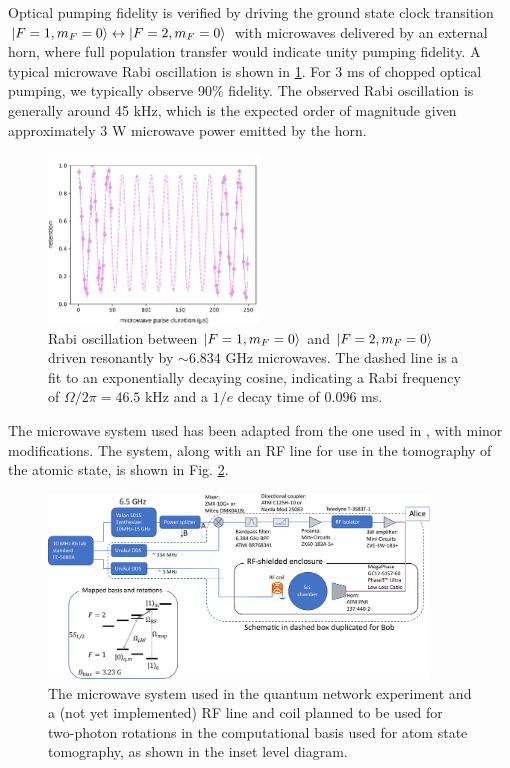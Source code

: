 Optical pumping fidelity is verified by driving the ground state clock transition $\ket{F=1,m_F=0} \leftrightarrow \ket{F=2,m_F=0}$ with microwaves delivered by an external horn, where full population transfer would indicate unity pumping fidelity. A typical microwave Rabi oscillation is shown in \ref{fig:microwave_oscillation}. For 3 ms of chopped optical pumping, we typically observe 90$\%$ fidelity. The observed Rabi oscillation is generally around 45 kHz, which is the expected order of magnitude given approximately 3 W microwave power emitted by the horn\cite{kwon2019rydberg}.
\begin{figure}[!hb]
    \centering
    \includegraphics[width=0.5\textwidth]{Images/good_microwave_Rabi_experiment 19212_19211.pdf}
    \caption{Rabi oscillation between $\ket{F=1,m_F=0}$ and $\ket{F=2,m_F=0}$ driven resonantly by $\sim6.834$ GHz microwaves. The dashed line is a fit to an exponentially decaying cosine, indicating a Rabi frequency of $\Omega/2\pi=46.5$ kHz and a $1/e$ decay time of $0.096$ ms.}
    \label{fig:microwave_oscillation}
\end{figure}

The microwave system used has been adapted from the one used in \cite{Young2022thesis,kwon2019rydberg}, with minor modifications. The system, along with an RF line for use in the tomography of the atomic state, is shown in Fig. \ref{fig:microwave_system}.

\begin{figure}[!ht]
    \centering
    \includegraphics[width=0.9\textwidth]{Images/microwave_system_schematic.pdf}
    \caption{The microwave system used in the quantum network experiment and a (not yet implemented) RF line and coil planned to be used for two-photon rotations in the computational basis used for atom state tomography, as shown in the inset level diagram.}
    \label{fig:microwave_system}
\end{figure}

